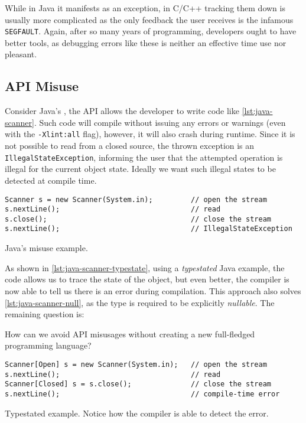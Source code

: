 While in Java it manifests as an exception,
in C/C++ tracking them down is usually more complicated as the only feedback the user receives is the infamous \texttt{SEGFAULT}.
Again, after so many years of programming, developers ought to have better tools,
as debugging errors like these is neither an effective time use nor pleasant.

\subsection{API Misuse}

Consider Java's , the API allows the developer to write code like \autoref{lst:java-scanner}.
Such code will compile without issuing any errors or warnings (even with the \texttt{-Xlint:all} flag),
however, it will also crash during runtime.
Since it is not possible to read from a closed source, the thrown exception is an \texttt{IllegalStateException},
informing the user that the attempted operation is illegal for the current object state.
Ideally we want such illegal states to be detected at compile time.

\begin{listing}
    \begin{verbatim}
Scanner s = new Scanner(System.in);         // open the stream
s.nextLine();                               // read
s.close();                                  // close the stream
s.nextLine();                               // IllegalStateException
    \end{verbatim}
    \caption{Java's  misuse example.}
    \label{lst:java-scanner}
\end{listing}

As shown in \autoref{lst:java-scanner-typestate}, using a \emph{typestated} Java example,
the code allows us to trace the state of the object, but even better,
the compiler is now able to tell us there is an error during compilation.
This approach also solves \autoref{lst:java-scanner-null}, as the type is required to be explicitly \emph{nullable}.
The remaining question is:
\begin{displayquote}
    How can we avoid API misusages without creating a new full-fledged programming language?
\end{displayquote}

\begin{listing}
    \begin{verbatim}
Scanner[Open] s = new Scanner(System.in);   // open the stream
s.nextLine();                               // read
Scanner[Closed] s = s.close();              // close the stream
s.nextLine();                               // compile-time error
    \end{verbatim}
    \caption{
        Typestated  example.
        Notice how the compiler is able to detect the error.
    }
    \label{lst:java-scanner-typestate}
\end{listing}


